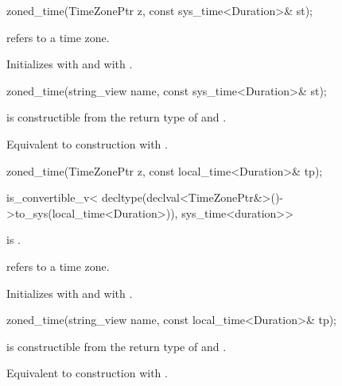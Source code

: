\begin{itemdecl}
zoned_time(TimeZonePtr z, const sys_time<Duration>& st);
\end{itemdecl}

\begin{itemdescr}
\pnum
\expects
{} refers to a time zone.

\pnum
\effects
Initializes  with  and  with .
\end{itemdescr}

\begin{itemdecl}
zoned_time(string_view name, const sys_time<Duration>& st);
\end{itemdecl}

\begin{itemdescr}
\pnum
\constraints
{} is constructible from the return type of  and .

\pnum
\effects
Equivalent to construction with .
\end{itemdescr}

\begin{itemdecl}
zoned_time(TimeZonePtr z, const local_time<Duration>& tp);
\end{itemdecl}

\begin{itemdescr}
\pnum
\constraints
\begin{codeblock}
is_convertible_v<
  decltype(declval<TimeZonePtr&>()->to_sys(local_time<Duration>{})),
  sys_time<duration>>
\end{codeblock}
is .

\pnum
\expects
{} refers to a time zone.

\pnum
\effects
Initializes  with  and  with .
\end{itemdescr}

\begin{itemdecl}
zoned_time(string_view name, const local_time<Duration>& tp);
\end{itemdecl}

\begin{itemdescr}
\pnum
\constraints
{} is constructible from the return type of  and .

\pnum
\effects
Equivalent to construction with .
\end{itemdescr}

